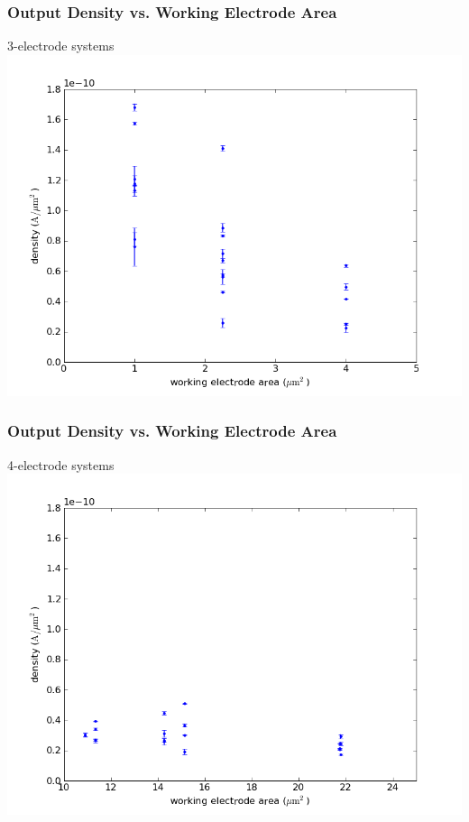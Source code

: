 \documentclass[10pt]{beamer}
\begin{document}
\begin{frame}
	\frametitle{Output Density vs. Working Electrode Area}
	3-electrode systems
	\includegraphics[width=0.8\linewidth]{figures/area_low_v_density.png}
\end{frame}

\begin{frame}
	\frametitle{Output Density vs. Working Electrode Area}
	4-electrode systems
	\includegraphics[width=0.8\linewidth]{figures/area_high_v_density.png}
\end{frame}
\end{document}
